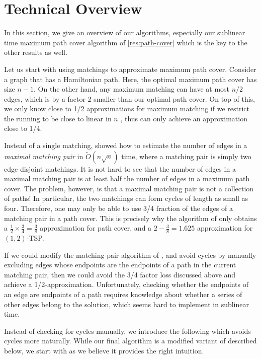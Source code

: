 \documentclass[letterpaper,11pt]{article}
\begin{document}
\section{Technical Overview}\label{sec:techniques}

In this section, we give an overview of our algorithms, especially our sublinear time maximum path cover algorithm of \cref{res:path-cover} which is the key to the other results as well.


Let us start with using matchings to approximate maximum path cover. Consider a graph that has a Hamiltonian path. Here, the optimal maximum path cover has size $n-1$. On the other hand, any maximum matching can have at most $n/2$ edges, which is by a factor 2 smaller than our optimal path cover. On top of this, we only know close to 1/2 approximations for maximum matching if we restrict the running to be close to linear in $n$ \cite{behnezhad2021,BehnezhadRRS-ArXiv22}, thus can only achieve an approximation close to 1/4.

Instead of a single matching, \citet*{chen2020} showed how to estimate the number of edges in a {\em maximal matching pair} in $\widetilde{O}(n\sqrt{n})$ time, where a matching pair is simply two edge disjoint matchings. It is not hard to see that the number of edges in a maximal matching pair is at least half the number of edges in a maximum path cover. The problem, however, is that a maximal matching pair is not a collection of paths! In particular, the two matchings can form cycles of length as small as four. Therefore, one may only be able to use 3/4 fraction of the edges of a matching pair in a path cover. This is precisely why the algorithm of \cite{chen2020} only obtains a $\frac{1}{2} \times \frac{3}{4} = \frac{3}{8}$ approximation for path cover, and a $2-\frac{3}{8} = 1.625$ approximation for $(1,2)$-TSP.  

If we could modify the matching pair algorithm of \cite{chen2020}, and avoid cycles by manually excluding edges whose endpoints are the endpoints of a path in the current matching pair, then we could avoid the 3/4 factor loss discussed above and achieve a 1/2-approximation. Unfortunately, checking whether the endpoints of an edge are endpoints of a path requires knowledge about whether a series of other edges belong to the solution, which seems hard to implement in sublinear time. 

Instead of checking for cycles manually, we introduce the following  which avoids cycles more naturally. While our final algorithm is a modified variant of  described below, we start with  as we believe it provides the right intuition.
\end{document}
